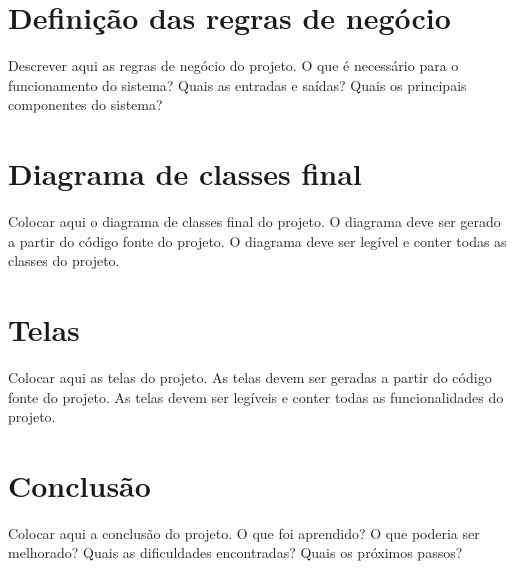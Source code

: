 \documentclass[12pt]{article}
\begin{document}
\section{Definição das regras de negócio}
\label{sec:regras}

Descrever aqui as regras de negócio do projeto. O que é necessário para o funcionamento do sistema? Quais as entradas e saídas? Quais os principais componentes do sistema?

\section{Diagrama de classes final}
\label{sec:classes}

Colocar aqui o diagrama de classes final do projeto. O diagrama deve ser gerado a partir do código fonte do projeto. O diagrama deve ser legível e conter todas as classes do projeto.

\section{Telas}
\label{sec:telas}

Colocar aqui as telas do projeto. As telas devem ser geradas a partir do código fonte do projeto. As telas devem ser legíveis e conter todas as funcionalidades do projeto.

\section{Conclusão}
\label{sec:conclusao}

Colocar aqui a conclusão do projeto. O que foi aprendido? O que poderia ser melhorado? Quais as dificuldades encontradas? Quais os próximos passos?


\end{document}
